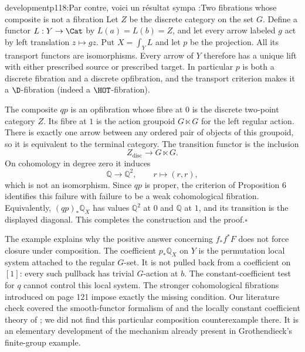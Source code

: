 \begin{dcomment}{development}{p118:Par contre, voici un résultat sympa :}{Two fibrations whose composite is not a fibration}
Let $Z$ be the discrete category on the set $G$. Define a functor $L:Y\to\Cat$ by $L(a)=L(b)=Z$, and let every arrow labeled $g$ act by left translation $z\mapsto gz$. Put $X=\int_Y L$ and let $p$ be the projection. All its transport functors are isomorphisms. Every arrow of $Y$ therefore has a unique lift with either prescribed source or prescribed target. In particular $p$ is both a discrete fibration and a discrete opfibration, and the transport criterion makes it a $\D$-fibration (indeed a $\HOT$-fibration).

The composite $qp$ is an opfibration whose fibre at $0$ is the discrete two-point category $Z$. Its fibre at $1$ is the action groupoid $G\ltimes G$ for the left regular action. There is exactly one arrow between any ordered pair of objects of this groupoid, so it is equivalent to the terminal category. The transition functor is the inclusion
\[
 Z_{\mathrm{disc}}\longrightarrow G\ltimes G.
\]
On cohomology in degree zero it induces
\[
 \mathbb Q\longrightarrow\mathbb Q^2,
 \qquad r\longmapsto(r,r),
\]
which is not an isomorphism. Since $qp$ is proper, the criterion of Proposition 6 identifies this failure with failure to be a weak cohomological fibration. Equivalently, $(qp)_*\mathbb Q_X$ has values $\mathbb Q^2$ at $0$ and $\mathbb Q$ at $1$, and its transition is the displayed diagonal. This completes the construction and the proof.\hfill$\square$

The example explains why the positive answer concerning $f_*f^*F$ does not force closure under composition. The coefficient $p_*\mathbb Q_X$ on $Y$ is the permutation local system attached to the regular $G$-set. It is not pulled back from a coefficient on $[1]$: every such pullback has trivial $G$-action at $b$. The constant-coefficient test for $q$ cannot control this local system. The stronger cohomological fibrations introduced on page 121 impose exactly the missing condition. Our literature check covered the smooth-functor formalism of \citet{Maltsiniotis2005Asphericite} and the locally constant coefficient theory of \citet{Cisinski2009LocallyConstant}; we did not find this particular composition counterexample there. It is an elementary development of the mechanism already present in Grothendieck's finite-group example.
\end{dcomment}

